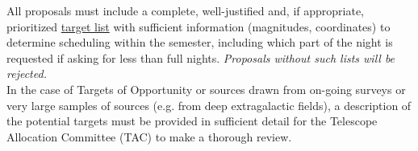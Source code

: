 \documentclass[12pt]{article}
\begin{document}
\noindent
All proposals must include a complete, well-justified and, if appropriate, prioritized \href{https://nexsci.caltech.edu/missions/KeckSolicitation/gen-info.shtml#Ibi}{target list} with 
sufficient information (magnitudes, coordinates) to determine scheduling within the semester, 
including which part of the night is requested if asking for less than full nights. \emph {Proposals without 
such lists will be rejected.} \\

\noindent
In the case of Targets of Opportunity or sources drawn from on-going surveys or very large samples of sources (e.g. from deep extragalactic fields), a description of 
the potential targets must be provided in sufficient detail for the Telescope Allocation Committee 
(TAC) to make a thorough review.
\end{document}
